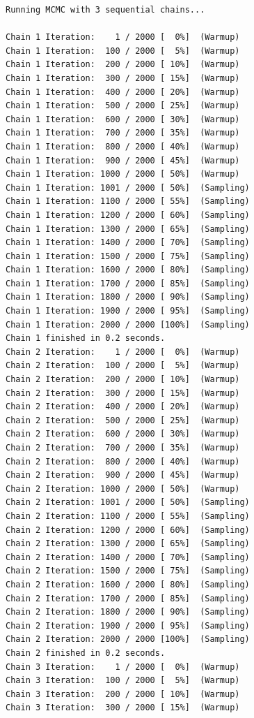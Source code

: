 \documentclass[
  13,
  letterpaper,
]{report}
\begin{document}
\begin{verbatim}
Running MCMC with 3 sequential chains...

Chain 1 Iteration:    1 / 2000 [  0%]  (Warmup) 
Chain 1 Iteration:  100 / 2000 [  5%]  (Warmup) 
Chain 1 Iteration:  200 / 2000 [ 10%]  (Warmup) 
Chain 1 Iteration:  300 / 2000 [ 15%]  (Warmup) 
Chain 1 Iteration:  400 / 2000 [ 20%]  (Warmup) 
Chain 1 Iteration:  500 / 2000 [ 25%]  (Warmup) 
Chain 1 Iteration:  600 / 2000 [ 30%]  (Warmup) 
Chain 1 Iteration:  700 / 2000 [ 35%]  (Warmup) 
Chain 1 Iteration:  800 / 2000 [ 40%]  (Warmup) 
Chain 1 Iteration:  900 / 2000 [ 45%]  (Warmup) 
Chain 1 Iteration: 1000 / 2000 [ 50%]  (Warmup) 
Chain 1 Iteration: 1001 / 2000 [ 50%]  (Sampling) 
Chain 1 Iteration: 1100 / 2000 [ 55%]  (Sampling) 
Chain 1 Iteration: 1200 / 2000 [ 60%]  (Sampling) 
Chain 1 Iteration: 1300 / 2000 [ 65%]  (Sampling) 
Chain 1 Iteration: 1400 / 2000 [ 70%]  (Sampling) 
Chain 1 Iteration: 1500 / 2000 [ 75%]  (Sampling) 
Chain 1 Iteration: 1600 / 2000 [ 80%]  (Sampling) 
Chain 1 Iteration: 1700 / 2000 [ 85%]  (Sampling) 
Chain 1 Iteration: 1800 / 2000 [ 90%]  (Sampling) 
Chain 1 Iteration: 1900 / 2000 [ 95%]  (Sampling) 
Chain 1 Iteration: 2000 / 2000 [100%]  (Sampling) 
Chain 1 finished in 0.2 seconds.
Chain 2 Iteration:    1 / 2000 [  0%]  (Warmup) 
Chain 2 Iteration:  100 / 2000 [  5%]  (Warmup) 
Chain 2 Iteration:  200 / 2000 [ 10%]  (Warmup) 
Chain 2 Iteration:  300 / 2000 [ 15%]  (Warmup) 
Chain 2 Iteration:  400 / 2000 [ 20%]  (Warmup) 
Chain 2 Iteration:  500 / 2000 [ 25%]  (Warmup) 
Chain 2 Iteration:  600 / 2000 [ 30%]  (Warmup) 
Chain 2 Iteration:  700 / 2000 [ 35%]  (Warmup) 
Chain 2 Iteration:  800 / 2000 [ 40%]  (Warmup) 
Chain 2 Iteration:  900 / 2000 [ 45%]  (Warmup) 
Chain 2 Iteration: 1000 / 2000 [ 50%]  (Warmup) 
Chain 2 Iteration: 1001 / 2000 [ 50%]  (Sampling) 
Chain 2 Iteration: 1100 / 2000 [ 55%]  (Sampling) 
Chain 2 Iteration: 1200 / 2000 [ 60%]  (Sampling) 
Chain 2 Iteration: 1300 / 2000 [ 65%]  (Sampling) 
Chain 2 Iteration: 1400 / 2000 [ 70%]  (Sampling) 
Chain 2 Iteration: 1500 / 2000 [ 75%]  (Sampling) 
Chain 2 Iteration: 1600 / 2000 [ 80%]  (Sampling) 
Chain 2 Iteration: 1700 / 2000 [ 85%]  (Sampling) 
Chain 2 Iteration: 1800 / 2000 [ 90%]  (Sampling) 
Chain 2 Iteration: 1900 / 2000 [ 95%]  (Sampling) 
Chain 2 Iteration: 2000 / 2000 [100%]  (Sampling) 
Chain 2 finished in 0.2 seconds.
Chain 3 Iteration:    1 / 2000 [  0%]  (Warmup) 
Chain 3 Iteration:  100 / 2000 [  5%]  (Warmup) 
Chain 3 Iteration:  200 / 2000 [ 10%]  (Warmup) 
Chain 3 Iteration:  300 / 2000 [ 15%]  (Warmup) 

\end{verbatim}
\end{document}

